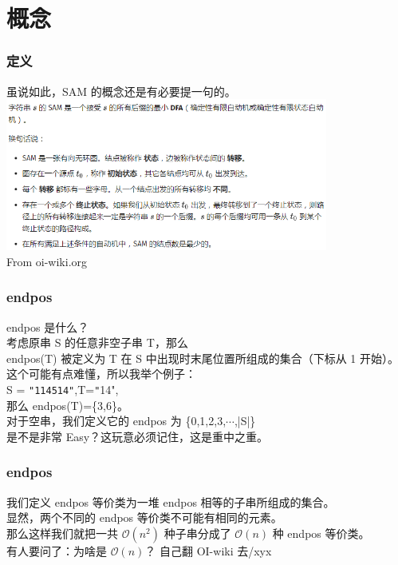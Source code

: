 \documentclass{beamer}
\begin{document}
    \section*{概念}

    \begin{frame}
        \frametitle{定义}
        虽说如此，SAM 的概念还是有必要提一句的。  \\
        \includegraphics[height=5cm]{g2.png} \\
        From oi-wiki.org

    \end{frame}

    \begin{frame}
        \frametitle{endpos}
        endpos 是什么？\\
        考虑原串 S 的任意非空子串 T，那么\\
        endpos(T) 被定义为 T 在 S 中出现时末尾位置所组成的集合（下标从 1 开始）。\\
        这个可能有点难懂，所以我举个例子：\\
        S = \texttt{"114514"}\textnormal,T=\texttt"14",\\
        那么 endpos(T)=\{3,6\}。\\
        对于空串，我们定义它的 endpos 为 \{0,1,2,3,$\cdots$,|S|\}\\
        是不是非常 Easy？这玩意必须记住，这是重中之重。
    \end{frame}

    \begin{frame}
        \frametitle{endpos}
        我们定义 endpos 等价类为一堆 endpos 相等的子串所组成的集合。\\
        显然，两个不同的 endpos 等价类不可能有相同的元素。\\
        那么这样我们就把一共 $\mathcal{O}(n^2)$ 种子串分成了 $\mathcal{O}(n)$ 种 endpos 等价类。\\
        有人要问了：为啥是 $\mathcal{O}(n)$？ 自己翻 OI-wiki 去/xyx
    \end{frame}
\end{document}
